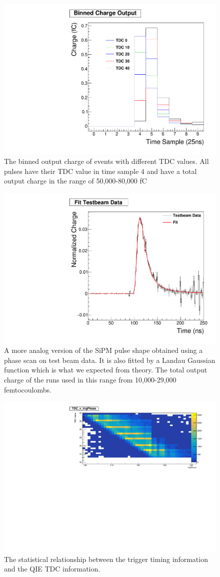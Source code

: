 \begin{figure}
\centering
\includegraphics[width=0.6\linewidth]{Figures/Phase.pdf}
\caption{The binned output charge of events with different TDC values. All pulses have their TDC value in time sample 4 and have a total output charge in the range of 50,000-80,000 fC}
\label{fig:Phase}
\end{figure}

\begin{figure}
\centering
\includegraphics[width=0.6\linewidth]{Figures/FittedPlot.pdf}
\caption{A more analog version of the SiPM pulse shape obtained using a phase scan on test beam data. It is also fitted by a Landau Gaussian function which is what we expected from theory. The total output charge of the runs used in this range from 10,000-29,000 femtocoulombs.}
\label{fig:fit}
\end{figure}

\begin{figure}
\centering
\includegraphics[width=\linewidth]{Figures/TDCvTrigPhase.pdf}
\caption{The statistical relationship between the trigger timing information and the QIE TDC information.}
\label{fig:tdc}
\end{figure}

